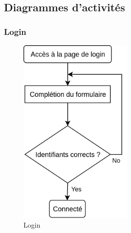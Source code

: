 \documentclass[a4paper, 12pt]{article}
\begin{document}
\subsection{Diagrammes d'activités}
\subsubsection{Login}
\begin{figure}
	\begin{center}
		\includegraphics[width=0.5\textwidth]{diagrams/login.png}
	\end{center}
    \caption{Login}
\end{figure}
\end{document}
